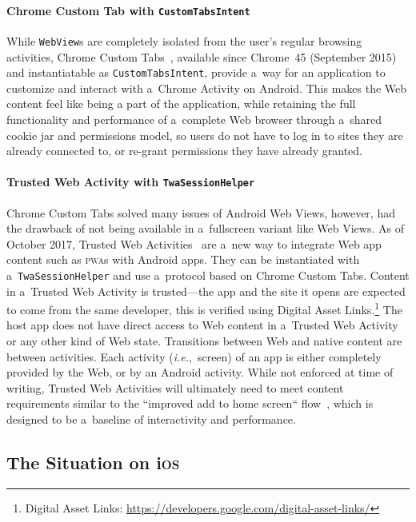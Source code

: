 \documentclass[sigconf]{acmart}
\begin{document}
\paragraph{Chrome Custom Tab with \texttt{CustomTabsIntent}}

While \texttt{WebView}s are completely isolated from the user's regular browsing activities,
Chrome Custom Tabs~\cite{kinlan2016customtabs}, available since Chrome~45 (September 2015)
and instantiatable as \texttt{CustomTabsIntent}, provide a~way for an application
to customize and interact with a~Chrome Activity on Android.
This makes the Web content feel like being a part of the application,
while retaining the full functionality and performance of a~complete Web browser
through a~shared cookie jar and permissions model, so users do not have to log in
to sites they are already connected to, or re-grant permissions they have already granted.

\paragraph{Trusted Web Activity with \texttt{TwaSessionHelper}}

Chrome Custom Tabs solved many issues of Android Web Views,
however, had the drawback of not being available in a~fullscreen variant like Web Views.
As of October 2017, Trusted Web Activities~\cite{googledevelopers2017twa} are a~new way to
integrate Web app content such as \textsc{pwa}s with Android apps.
They can be instantiated with a~\texttt{TwaSessionHelper}
and use a~protocol based on Chrome Custom Tabs.
Content in a~Trusted Web Activity is trusted---the app and the site it opens
are expected to come from the same developer, this is verified using Digital Asset
Links.\footnote{Digital Asset Links:
\url{https://developers.google.com/digital-asset-links/}}
The host app does not have direct access to Web content in a~Trusted Web Activity
or any other kind of Web state.
Transitions between Web and native content are between activities.
Each activity (\emph{i.e.},\ screen) of an app is either completely provided by the Web,
or by an Android activity.
While not enforced at time of writing, Trusted Web Activities
will ultimately need to meet content requirements
similar to the ``improved add to home screen`` flow~\cite{kinlan2017a2hs},
which is designed to be a~baseline of interactivity and performance.

\subsection{The Situation on i\textsc{os}}
\end{document}
